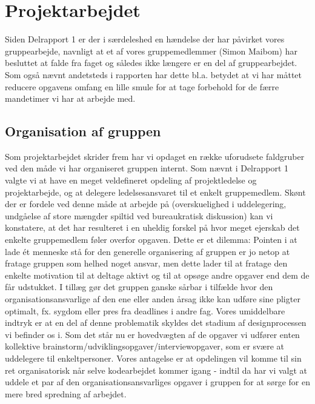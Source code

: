 \documentclass[10pt,a4paper,danish]{article}
\begin{document}
\section{Projektarbejdet}
Siden Delrapport 1 er der i særdeleshed en hændelse der har påvirket vores gruppearbejde, navnligt at et af vores gruppemedlemmer (Simon Maibom) har besluttet at falde fra faget og således ikke længere er en del af gruppearbejdet. Som også nævnt andetsteds i rapporten har dette bl.a. betydet at vi har måttet reducere opgavens omfang en lille smule for at tage forbehold for de færre mandetimer vi har at arbejde med. 
\newline
\newline
\subsection{Organisation af gruppen}
Som projektarbejdet skrider frem har vi opdaget en række uforudsete faldgruber ved den måde vi har organiseret gruppen internt. Som nævnt i Delrapport 1 valgte vi at have en meget veldefineret opdeling af projektledelse og projektarbejde, og at delegere ledelsesansvaret til et enkelt gruppemedlem. Skønt der er fordele ved denne måde at arbejde på (overskuelighed i uddelegering, undgåelse af store mængder spiltid ved bureaukratisk diskussion) kan vi konstatere, at det har resulteret i en uheldig forskel på hvor meget ejerskab det enkelte gruppemedlem føler overfor opgaven. Dette er et dilemma: Pointen i at lade ét menneske stå for den generelle organisering af gruppen er jo netop at fratage gruppen som helhed noget ansvar, men dette lader til at fratage den enkelte motivation til at deltage aktivt og til at opsøge andre opgaver end dem de får udstukket. I tillæg gør det gruppen ganske sårbar i tilfælde hvor den organisationsansvarlige af den ene eller anden årsag ikke kan udføre sine pligter optimalt, fx. sygdom eller pres fra deadlines i andre fag. 
\newline
\newline
Vores umiddelbare indtryk er at en del af denne problematik skyldes det stadium af designprocessen vi befinder os i. Som det står nu er hovedvægten af de opgaver vi udfører enten kollektive brainstorm/udviklingsopgaver/interviewopgaver, som er svære at uddelegere til enkeltpersoner. Vores antagelse er at opdelingen vil komme til sin ret organisatorisk når selve kodearbejdet kommer igang - indtil da har vi valgt at uddele et par af den organisationsansvarliges opgaver i gruppen for at sørge for en mere bred spredning af arbejdet. 
\end{document}
